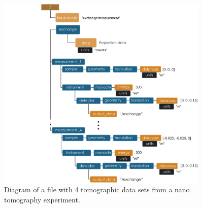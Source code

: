 \begin{figure}[h!]
\centering
\includegraphics[width=0.9\textwidth]{figures/dx_NanoTomo1.pdf}
\caption{Diagram of a file with 4 tomographic data sets from a nano tomography experiment.}
\label{fig:NanoTomo1}
\end{figure}

